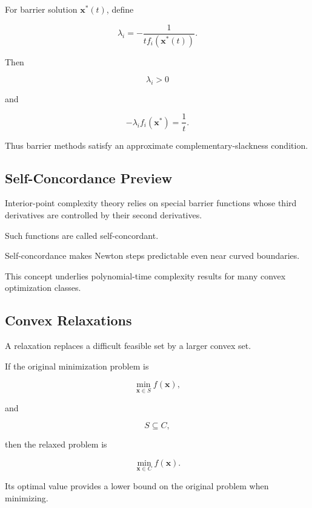 For barrier solution \(\mathbf{x}^*(t)\), define

\[
\boxed{
\lambda_i
=
-
\frac{
1
}{
t f_i(\mathbf{x}^*(t))
}.
}
\]

Then

\[
\lambda_i>0
\]

and

\[
\boxed{
-\lambda_i f_i(\mathbf{x}^*)
=
\frac1t.
}
\]

Thus barrier methods satisfy an approximate complementary-slackness
condition.

\subsection{Self-Concordance Preview}
\label{subsec:self-concordance-preview}

Interior-point complexity theory relies on special barrier functions whose
third derivatives are controlled by their second derivatives.

Such functions are called self-concordant.

Self-concordance makes Newton steps predictable even near curved
boundaries.

This concept underlies polynomial-time complexity results for many convex
optimization classes.

\subsection{Convex Relaxations}
\label{subsec:convex-relaxations}

A relaxation replaces a difficult feasible set by a larger convex set.

If the original minimization problem is

\[
\boxed{
\min_{\mathbf{x}\in S}
f(\mathbf{x}),
}
\]

and

\[
S\subseteq C,
\]

then the relaxed problem is

\[
\boxed{
\min_{\mathbf{x}\in C}
f(\mathbf{x}).
}
\]

Its optimal value provides a lower bound on the original problem when
minimizing.

